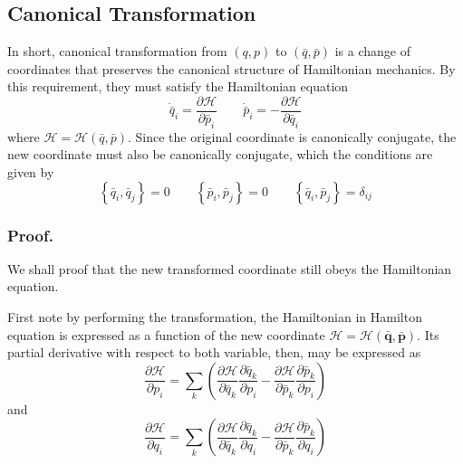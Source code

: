 \documentclass[../../../main.tex]{subfiles}
\begin{document}
\subsection{Canonical Transformation}
In short, canonical transformation from $(q,p)$ to $(\bar{q}, \bar{p})$ is a change of coordinates that preserves the canonical structure of Hamiltonian mechanics.
By this requirement, they must satisfy the Hamiltonian equation
\begin{equation*}
	\dot{\bar{q }}_i=\frac{\partial \mathcal{H }}{\partial \bar{p}_i}\qquad \dot{\bar{p }}_i=-\frac{\partial \mathcal{H }}{\partial \bar{q }_i}
\end{equation*}
where $\mathcal{H }=\mathcal{H}(\bar{q },\bar{p})$.
Since the original coordinate is canonically conjugate, the new coordinate must also be canonically conjugate, which the conditions are given by
\begin{equation*}
	\left\{ \bar{q}_i,\bar{q }_j  \right\}=0\qquad \left\{ \bar{p}_i,\bar{p}_j  \right\}=0\qquad \left\{ \bar{q}_i,\bar{p}_j  \right\}=\delta_{ij}
\end{equation*}

\subsubsection{Proof.}
We shall proof that the new transformed coordinate still obeys the Hamiltonian equation.

First note by performing the transformation, the Hamiltonian in Hamilton equation is expressed as a function of the new coordinate $\mathcal{H }=\mathcal{H }(\mathbf{\bar{q} },\mathbf{\bar{p} })$.
Its partial derivative with respect to both variable, then, may be expressed as
\begin{equation*}
	\frac{\partial \mathcal{H }}{\partial p_i }=
	\sum_k \left( \frac{\partial \mathcal{H }}{\partial \bar{q }_k }\frac{\partial \bar{q }_k }{\partial p_i }-\frac{\partial \mathcal{H }}{\partial \bar{p }_k }\frac{\partial \bar{p }_k }{\partial p_i } \right)
\end{equation*}
and
\begin{equation*}
	\frac{\partial \mathcal{H }}{\partial q_i}=
	\sum_k \left( \frac{\partial \mathcal{H }}{\partial \bar{q }_k }\frac{\partial \bar{q }_k }{\partial q_i }-\frac{\partial \mathcal{H }}{\partial \bar{p }_k }\frac{\partial \bar{p }_k }{\partial q_i } \right)
\end{equation*}
\end{document}
